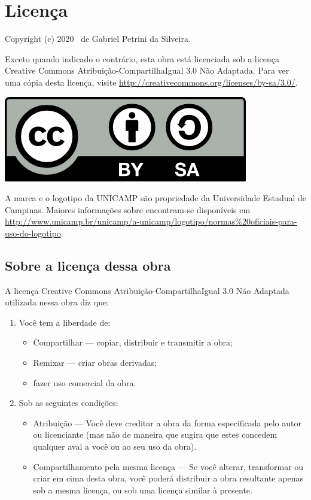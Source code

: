 \chapter*{Licença}
Copyright (c) 2020 \ de Gabriel Petrini da Silveira.

Exceto quando indicado o contrário, esta obra está licenciada sob a licença
Creative Commons Atribuição-CompartilhaIgual 3.0 Não Adaptada. Para ver uma
cópia desta licença, visite
\url{http://creativecommons.org/licenses/by-sa/3.0/}.

\begin{center}
  \includegraphics{cc-by-sa.png}
\end{center}


A marca e o logotipo da UNICAMP são propriedade da Universidade Estadual de
Campinas. Maiores informações sobre encontram-se disponíveis em
\url{http://www.unicamp.br/unicamp/a-unicamp/logotipo/normas%20oficiais-para-uso-do-logotipo}.

\section*{Sobre a licença dessa obra}
A licença Creative Commons Atribuição-CompartilhaIgual 3.0 Não Adaptada
utilizada nessa obra diz que:
\begin{enumerate}
  \item Você tem a liberdade de:
    \begin{itemize}
      \item Compartilhar — copiar, distribuir e transmitir a obra;
      \item Remixar — criar obras derivadas;
      \item fazer uso comercial da obra.
    \end{itemize}
  \item Sob as seguintes condições:
    \begin{itemize}
      \item Atribuição — Você deve creditar a obra da forma especificada pelo
        autor ou licenciante (mas não de maneira que sugira que estes concedem
        qualquer aval a você ou ao seu uso da obra).
      \item Compartilhamento pela mesma licença — Se você alterar, transformar
        ou criar em cima desta obra, você poderá distribuir a obra resultante
        apenas sob a mesma licença, ou sob uma licença similar à presente.
    \end{itemize}
\end{enumerate}